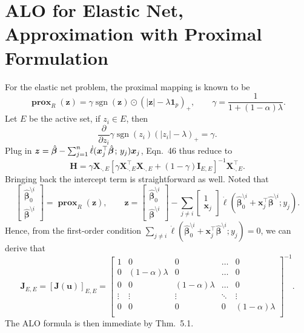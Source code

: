 \documentclass[11pt]{article}
\newcommand{\bx}{\bm{x}}
\newcommand{\bz}{\bm{z}}
\newcommand{\bH}{\bm{H}}
\newcommand{\bI}{\bm{I}}
\newcommand{\bX}{\bm{X}}
\newcommand{\bbeta}{\bm{\beta}}
\newcommand{\semicol}{\nobreak\mskip2mu\mathpunct{}\nonscript\mkern-\thinmuskip{;}\mskip6muplus1mu\relax}
\DeclareMathOperator{\sign}{sgn}
\DeclareMathOperator{\bprox}{\mathbf{prox}}
\newcommand{\refthm}[2]{#1~#2}
\begin{document}
\section{ALO for Elastic Net, Approximation with Proximal Formulation}
For the elastic net problem, the proximal mapping is known to be
	\begin{equation}
	\bprox_R\left(\bz\right)=\gamma\sign(\bz)\odot(|\bz|-\lambda\bm{1}_p)_+,\qquad\gamma=\frac{1}{1+(1-\alpha)\lambda}.
	\end{equation}
Let \(E\) be the active set, if \(z_i\in E\), then \[\frac{\partial}{\partial z_i}\gamma\sign(z_i)(|z_i|-\lambda)_+=\gamma.\] Plug in \(\bz=\hat{\bbeta}-\sum_{j=1}^{n}\dot{\ell}(\bx_j^\top\hat{\bbeta}\semicol y_j)\bx_j\), \refthm{Eqn.}{46} thus reduce to 
	\begin{equation}
	\bH=\gamma\bX_{\cdot,E}\left[\gamma\bX_{\cdot,E}^\top\bX_{\cdot,E}+\left(1-\gamma\right)\bI_{E,E}\right]^{-1}\bX_{\cdot,E}^\top.
	\end{equation}
Bringing back the intercept term is straightforward as well. Noted that \[\begin{bmatrix}
\hat{\bbeta}_0^{\setminus i} \\
\hat{\bm{\bbeta}}^{\setminus i}\end{bmatrix}=
\bprox_{R}\left(\bz\right),\qquad\bz=\begin{bmatrix}
\hat{\bbeta}_0^{\setminus i} \\
\hat{\bm{\bbeta}}^{\setminus i}\end{bmatrix}-
\sum_{j\neq i}\begin{bmatrix}
1 \\
\bm{x}_j\end{bmatrix}
\dot{\ell}\left(\hat{\bbeta}_0^{\setminus i}+\bm{x}_j^\top\hat{\bm{\bbeta}}^{\setminus i};y_j\right).\] Hence, from the first-order condition \(\sum_{j\neq i}\dot{\ell}\left(\hat{\bbeta}_0^{\setminus i}+\bm{x}_j^\top\hat{\bm{\bbeta}}^{\setminus i};y_j\right)=0\), we can derive that 
	\begin{equation}
	\bm{J}_{E,E}=
	\left[\bm{J}(\bm{u})\right]_{E,E}=
	\begin{bmatrix}
	1 & 0 & 0 & \dots & 0\\
	0 & (1-\alpha)\lambda & 0 & \dots & 0\\
	0 & 0 & (1-\alpha)\lambda & \dots & 0\\
	\vdots & \vdots & \vdots & \ddots & \vdots\\
	0 & 0 & 0 & 0 & (1-\alpha)\lambda\\
	\end{bmatrix}^{-1}.
	\end{equation}
The ALO formula is then immediate by \refthm{Thm.}{5.1}.
\end{document}
